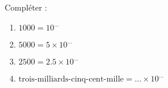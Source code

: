 
\begin{exercice}\label{exo2smath-0203}

    Compléter :
    \begin{enumerate}
        \item
            \( 1000=10^{\ldots}\)
        \item
            \( 5000=5\times 10^{\ldots}\)
        \item
            \( 2500=2.5\times 10^{\ldots}\)
        \item
            $\text{trois-milliards-cinq-cent-mille}=\ldots\times 10^{\ldots}$
    \end{enumerate}

\end{exercice}
